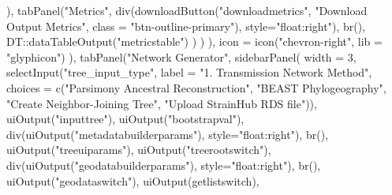 \documentclass[
]{article}
\newenvironment{Shaded}{\begin{snugshade}}{\end{snugshade}}
\newcommand{\AttributeTok}[1]{\textcolor[rgb]{0.77,0.63,0.00}{#1}}
\newcommand{\DecValTok}[1]{\textcolor[rgb]{0.00,0.00,0.81}{#1}}
\newcommand{\FunctionTok}[1]{\textcolor[rgb]{0.00,0.00,0.00}{#1}}
\newcommand{\NormalTok}[1]{#1}
\newcommand{\SpecialCharTok}[1]{\textcolor[rgb]{0.00,0.00,0.00}{#1}}
\newcommand{\StringTok}[1]{\textcolor[rgb]{0.31,0.60,0.02}{#1}}
\begin{document}
\begin{Shaded}
\begin{Highlighting}[]
\NormalTok{                 ),}
                 \FunctionTok{tabPanel}\NormalTok{(}\StringTok{"Metrics"}\NormalTok{,}
                          \FunctionTok{div}\NormalTok{(}\FunctionTok{downloadButton}\NormalTok{(}\StringTok{"downloadmetrics"}\NormalTok{, }\StringTok{"Download Output Metrics"}\NormalTok{, }\AttributeTok{class =} \StringTok{"btn{-}outline{-}primary"}\NormalTok{), }\AttributeTok{style=}\StringTok{"float:right"}\NormalTok{),}
                          \FunctionTok{br}\NormalTok{(),}
\NormalTok{                          DT}\SpecialCharTok{::}\FunctionTok{dataTableOutput}\NormalTok{(}\StringTok{"metricstable"}\NormalTok{)}
\NormalTok{                 )}
\NormalTok{               )}
\NormalTok{             ),}
             \AttributeTok{icon =} \FunctionTok{icon}\NormalTok{(}\StringTok{"chevron{-}right"}\NormalTok{, }\AttributeTok{lib =} \StringTok{"glyphicon"}\NormalTok{)}
\NormalTok{             ),}
    \FunctionTok{tabPanel}\NormalTok{(}\StringTok{"Network Generator"}\NormalTok{,}
             \FunctionTok{sidebarPanel}\NormalTok{(}
               \AttributeTok{width =} \DecValTok{3}\NormalTok{,}
               \FunctionTok{selectInput}\NormalTok{(}\StringTok{"tree\_input\_type"}\NormalTok{,}
                           \AttributeTok{label =} \StringTok{"1. Transmission Network Method"}\NormalTok{,}
                           \AttributeTok{choices =} \FunctionTok{c}\NormalTok{(}\StringTok{"Parsimony Ancestral Reconstruction"}\NormalTok{, }\StringTok{"BEAST Phylogeography"}\NormalTok{, }\StringTok{"Create Neighbor{-}Joining Tree"}\NormalTok{, }\StringTok{"Upload StrainHub RDS file"}\NormalTok{)),}
               \FunctionTok{uiOutput}\NormalTok{(}\StringTok{"inputtree"}\NormalTok{),}
               \FunctionTok{uiOutput}\NormalTok{(}\StringTok{"bootstrapval"}\NormalTok{),}
               \FunctionTok{div}\NormalTok{(}\FunctionTok{uiOutput}\NormalTok{(}\StringTok{"metadatabuilderparams"}\NormalTok{), }\AttributeTok{style=}\StringTok{"float:right"}\NormalTok{),}
               \FunctionTok{br}\NormalTok{(),}
               \FunctionTok{uiOutput}\NormalTok{(}\StringTok{"treeuiparams"}\NormalTok{),}
               \FunctionTok{uiOutput}\NormalTok{(}\StringTok{"treerootswitch"}\NormalTok{),}
               \FunctionTok{div}\NormalTok{(}\FunctionTok{uiOutput}\NormalTok{(}\StringTok{"geodatabuilderparams"}\NormalTok{), }\AttributeTok{style=}\StringTok{"float:right"}\NormalTok{),}
               \FunctionTok{br}\NormalTok{(),}
               \FunctionTok{uiOutput}\NormalTok{(}\StringTok{"geodataswitch"}\NormalTok{),}
               \FunctionTok{uiOutput}\NormalTok{(}\StringTok{\textquotesingle{}getlistswitch\textquotesingle{}}\NormalTok{),}


\end{Highlighting}
\end{Shaded}
\end{document}
